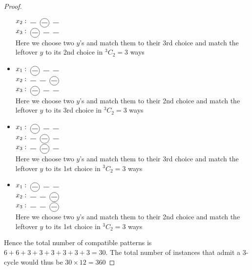 \documentclass[a4paper,10pt]{article}
\theoremstyle{plain} %
\theoremstyle{plain} %
\newcommand*\circled[1]{\tikz[baseline=(char.base)]{
            \node[shape=circle,draw,inner sep=2pt] (char) {#1};}}
\begin{document}
\begin{proof}
\begin{itemize}
        $x_2: \; \rule{0.3cm}{0.15mm} \; \; \circled{\rule{0.3cm}{0.15mm}} \; \; \rule{0.3cm}{0.15mm}$ \\
        $x_3: \; \circled{\rule{0.3cm}{0.15mm}} \; \; \rule{0.3cm}{0.15mm} \; \; \rule{0.3cm}{0.15mm}$ \\
        Here we choose two $y$'s and match them to their 3rd choice and match the leftover $y$ to its 2nd choice in $^3C_2 = 3$ ways
        \item 
        $x_1: \; \circled{\rule{0.3cm}{0.15mm}} \; \; \rule{0.3cm}{0.15mm} \; \; \rule{0.3cm}{0.15mm}$ \\
        $x_2: \; \rule{0.3cm}{0.15mm} \; \; \rule{0.3cm}{0.15mm} \; \; \circled{\rule{0.3cm}{0.15mm}}$ \\
        $x_3: \; \circled{\rule{0.3cm}{0.15mm}} \; \; \rule{0.3cm}{0.15mm} \; \; \rule{0.3cm}{0.15mm}$ \\
        Here we choose two $y$'s and match them to their 2nd choice and match the leftover $y$ to its 3rd choice in $^3C_2 = 3$ ways
        \item 
        $x_1: \; \circled{\rule{0.3cm}{0.15mm}} \; \; \rule{0.3cm}{0.15mm} \; \; \rule{0.3cm}{0.15mm}$ \\
        $x_2: \; \rule{0.3cm}{0.15mm} \; \; \circled{\rule{0.3cm}{0.15mm}} \; \; \rule{0.3cm}{0.15mm}$ \\
        $x_3: \; \rule{0.3cm}{0.15mm} \; \; \circled{\rule{0.3cm}{0.15mm}} \; \; \rule{0.3cm}{0.15mm}$ \\
        Here we choose two $y$'s and match them to their 3rd choice and match the leftover $y$ to its 1st choice in $^3C_2 = 3$ ways
        \item 
        $x_1: \; \circled{\rule{0.3cm}{0.15mm}} \; \; \rule{0.3cm}{0.15mm} \; \; \rule{0.3cm}{0.15mm}$ \\
        $x_2: \; \rule{0.3cm}{0.15mm} \; \; \rule{0.3cm}{0.15mm} \; \; \circled{\rule{0.3cm}{0.15mm}}$ \\
        $x_3: \; \rule{0.3cm}{0.15mm} \; \; \rule{0.3cm}{0.15mm} \; \; \circled{\rule{0.3cm}{0.15mm}}$ \\
        Here we choose two $y$'s and match them to their 2nd choice and match the leftover $y$ to its 1st choice in $^3C_2 = 3$ ways
    \end{itemize}

    Hence the total number of compatible patterns is $6 + 6 + 3 + 3 + 3 + 3 + 3 + 3 = 30$. The total number of instances that admit a 3-cycle would thus be $30 \times 12 = 360$
\end{proof}
\end{document}

